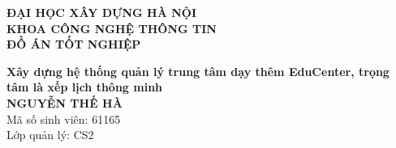 \documentclass[DoAn.tex]{subfiles}
\begin{document}
\begin{titlepage}
\thispagestyle{empty}
\begin{center}

{\textbf{\large{ĐẠI HỌC XÂY DỰNG HÀ NỘI}}}\\[0.5cm]
{\textbf{\large{KHOA CÔNG NGHỆ THÔNG TIN}}}\\[3cm]

{\textbf{\huge{ ĐỒ ÁN TỐT NGHIỆP}}}\\[1cm]
{\textbf{\Large{Xây dựng hệ thống quản lý trung tâm dạy thêm EduCenter, trọng tâm là xếp lịch thông minh}}\\[1cm]

{\textbf{\large{NGUYỄN THẾ HÀ}}}\\
{\large{Mã số sinh viên: 61165}}\\
{\large{Lớp quản lý: CS2}}\\[0.5cm]

\vspace{3cm}
\begin{table}[H]
\centering
{}
\end{table}}
\end{center}

\end{titlepage}
\end{document}
